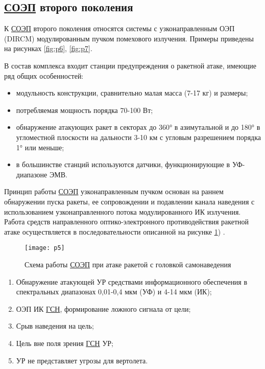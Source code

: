 \subsection{ \hyperref[acroSOEP]{СОЭП} второго поколения}	

К  \hyperref[acroSOEP]{СОЭП} второго поколения относятся системы с узконаправленным ОЭП (DIRCM) модулированным пучком помехового излучения. Примеры приведены на рисунках \ref{fig:p6}, \ref{fig:p7}.

В состав комплекса входит станции предупреждения о ракетной атаке, имеющие ряд общих особенностей:
\begin{itemize}
	\item модульность конструкции, сравнительно малая масса (7-17 кг) и размеры;
	\item потребляемая мощность порядка 70-100 Вт;
	\item обнаружение атакующих ракет в секторах до 360° в азимутальной и до 180° в угломестной плоскости на дальности 3-10 км с угловым разрешением порядка 1° или меньше;
	\item в большинстве станций используются датчики, функционирующие в УФ-диапазоне ЭМВ.
\end{itemize}

Принцип работы  \hyperref[acroSOEP]{СОЭП} узконаправленным пучком основан на раннем обнаружении пуска ракеты, ее сопровождении и подавлении канала наведения с использованием узконаправленного потока модулированного ИК излучения. Работа средств направленного оптико-электронного противодействия ракетной атаке осуществляется в последовательности описанной на рисунке \ref{fig:p5}) \cite[]{ForeignMilitary}.

\begin{figure}[ht]
	\centering
	\texttt{[image: p5]} 
	\caption{Схема работы  \hyperref[acroSOEP]{СОЭП} при атаке ракетой с головкой самонаведения}
	\label{fig:p5}
\end{figure}

\begin{enumerate}
	\item Обнаружение атакующей УР средствами информационного обеспечения в спектральных диапазонах 0,01-0,4 мкм (УФ) и 4-14 мкм (ИК);
	\item ОЭП ИК \hyperref[acroGSN]{ГСН}, формирование ложного сигнала от цели; 
	\item Срыв наведения на цель; 
	\item Цель вне поля зрения \hyperref[acroGSN]{ГСН} УР; 
	\item УР не представляет угрозы для вертолета.	
\end{enumerate}

